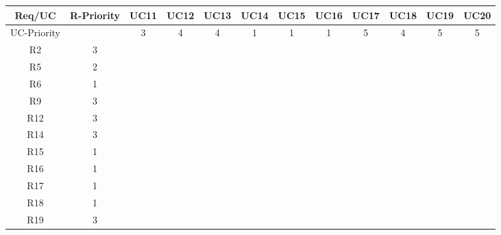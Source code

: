 \documentclass{article}
\begin{document}
\begin{longtable}{|c|c|c|c|c|c|c|c|c|c|c|c|}
	Req/UC      & R-Priority & UC11      & UC12      & UC13      & UC14      & UC15      & UC16      & UC17      & UC18      & UC19      & UC20      \\
	\hline
	UC-Priority &            & 3         & 4         & 4         & 1         & 1         & 1         & 5         & 4         & 5         & 5         \\
	\hline
	R2          & 3          &           &           &           &           &           &           &           &           &           &           \\
	\hline
	R5          & 2          &           &           &           &           &           &           &           &           &           &           \\
	\hline
	R6          & 1          &           &           &           &           &           &           &           &           &           &           \\
	\hline
	R9          & 3          &           &           &           &           &           &           &           &           &           &           \\
	\hline
	R12         & 3          &           &           &           &           &           &           &           &           &           &           \\
	\hline
	R14         & 3          &           &           &           &           &           &           &           &           &           &           \\
	\hline
	R15         & 1          &           &           &           &           &           &           &           &           &           &           \\
	\hline
	R16         & 1          &           &           &           &           &           &           &           &           &           &           \\
	\hline
	R17         & 1          &           &           &           &           &           &           &           &           &           &           \\
	\hline
	R18         & 1          &           &           &           &           &           &           &           &           &           &           \\
	\hline
	R19         & 3          &           &           &           &           &           &           &           &           &           &           \\

\end{longtable}
\end{document}
